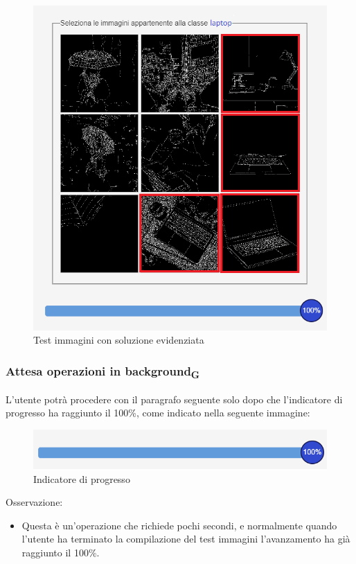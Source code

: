 \begin{figure}[H]
    \centering
    \includegraphics[scale=0.6]{src/img/computerlaptopevidenziati.png}
    \caption{Test immagini con soluzione evidenziata}
\end{figure}

\subsubsection{Attesa operazioni in background\textsubscript{G}}
L'utente potrà procedere con il paragrafo seguente solo dopo che l'indicatore di progresso ha raggiunto il 100\%, come indicato nella seguente immagine:
\begin{figure}[H]
    \centering
    \includegraphics[scale=0.8]{img/barra.png}
    \caption{Indicatore di progresso}
\end{figure}    

Osservazione:
\begin{itemize}
	\item Questa è un'operazione che richiede pochi secondi, e normalmente quando l'utente ha terminato la compilazione del test immagini l'avanzamento ha già raggiunto il 100\%.
\end{itemize}

